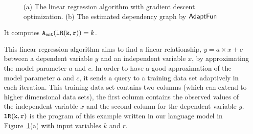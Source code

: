 \begin{example}
\begin{figure}
\begin{subfigure}{.4\textwidth}
\begin{centering}
     \caption{}
     \end{centering}
     \end{subfigure}
     \caption{(a) The linear regression algorithm with gradient descent optimization.
     (b) The estimated dependency graph by $\textsf{AdaptFun}$}
     \label{fig:linear_regression}
    \end{figure}
    It computes $ {\mathtt{A_{est}}}(\mathtt{lR(k, r)}) = k$.
    \end{example} 
    This linear regression algorithm 
    aims to
    find a linear relationship, $y = a \times x + c$ between a dependent variable $y$
    and an independent variable $x$, by approximating the 
    model parameter $a$ and $c$.
    In order to have a good approximation of the model parameter 
    $a$ and $c$, 
    it sends a query to a training data set adaptively in each iteration.
    This training data set contains two columns (which can extend to higher dimensional data sets), 
    the first column contains the observed values of the independent variable $x$ and the
    second column for the dependent variable $y$.
    $\mathtt{lR(k, r)}$ is the program of this example written in our language model in Figure~\ref{fig:linear_regression}(a)
    with input variables $k$ and $r$.
    
